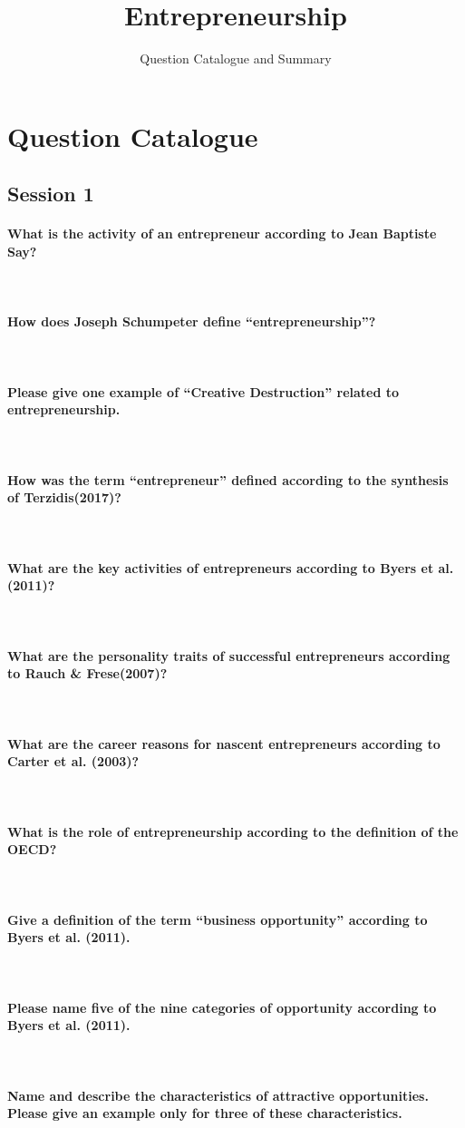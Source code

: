 \documentclass[10pt,a4paper,noendnumber=true]{scrartcl}
\title{Entrepreneurship}
\subtitle{Question Catalogue and Summary}
\author{}
\newcommand{\properparagraph}[1]{\paragraph{\textcolor{Emerald}{#1}}\mbox{}\\}
\begin{document}
\maketitle

\section{Question Catalogue}

\subsection{Session 1}

\properparagraph{What is the activity of an entrepreneur according to Jean Baptiste Say?}
\properparagraph{How does Joseph Schumpeter define "`entrepreneurship"'?}
\properparagraph{Please give one example of "`Creative Destruction"' related to entrepreneurship.}
\properparagraph{How was the term "`entrepreneur"' defined according to the synthesis of Terzidis(2017)?}
\properparagraph{What are the key activities of entrepreneurs according to Byers et al. (2011)?}
\properparagraph{What are the personality traits of successful entrepreneurs according to Rauch \& Frese(2007)?}
\properparagraph{What are the career reasons for nascent entrepreneurs according to Carter et al. (2003)?}
\properparagraph{What is the role of entrepreneurship according to the definition of the OECD?}
\properparagraph{Give a definition of the term "`business opportunity"' according to Byers et al. (2011).}
\properparagraph{Please name five of the nine categories of opportunity according to Byers et al. (2011).}
\properparagraph{Name and describe the characteristics of attractive opportunities. Please give an example only for three of these characteristics.}
\end{document}
